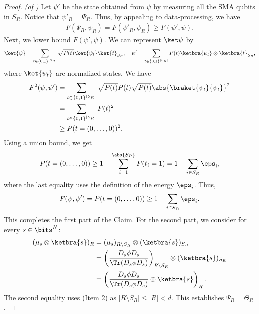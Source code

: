\documentclass{toc}
\begin{document}
%
%
%
%
%
%
%
%
%

\begin{proof}\textit{(of )}
Let $\psi'$ be the state obtained from $\psi$ by measuring all the SMA qubits in $S_R$. Notice that $\psi'_R=\Psi_R$. Thus, by appealing to data-processing, we have
\begin{align}
F(\Psi_R,\psi_R)=F(\psi'_R,\psi_R)\geq F(\psi',\psi).    
\end{align}
Next, we lower bound $F(\psi',\psi)$. We can represent $\ket \psi$ by
\begin{align}
\ket{\psi}=\sum_{t\in \{0,1\}^{|S_R|}}\sqrt{P(t)}\ket{\psi_t}\ket{t}_{S_R},\quad \psi'=\sum_{t\in \{0,1\}^{|S_R|}}P(t)\ketbra{\psi_t}\otimes\ketbra{t}_{S_R},
\end{align}
where $\ket{\psi_t}$ are normalized states. We have
\begin{align}
F^2(\psi,\psi') &= \sum_{t\in \{0,1\}^{|S_R|}}\sqrt{P(t)}P(t)\sqrt{P(t)}\abs{\braket{\psi_t}{\psi_t}}^2 \\ &=\sum_{t\in \{0,1\}^{|S_R|}}P(t)^2 \\
&\geq P(t = (0,\ldots,0))^2.
\end{align}
Using a union bound, we get 
\begin{align}
P(t = (0,\ldots,0)) \geq 1- \sum_{i=1}^{\abs{S_R}}P(t_i=1)= 1-\sum_{i\in S_R}\eps_i,
\end{align}
where the last equality uses the definition of the energy $\eps_i$. Thus,
\begin{align}
F(\psi,\psi')= P(t = (0,\ldots,0)) \geq 1-\sum_{i\in S_R}\eps_i.
\end{align}
This completes the first part of the Claim. For the second part, we consider for every $s\in \bits^N$:
\begin{align}
(\mu_s\otimes \ketbra{s})_{R}&=(\mu_s)_{R\setminus S_R}\otimes (\ketbra{s})_{S_R}\\
&=\left(\frac{D_s\phi D_s}{\Tr(D_s\phi D_s)}\right)_{R\setminus S_R}\otimes (\ketbra{s})_{S_R}\\
&=\left(\frac{D_s\phi D_s}{\Tr(D_s\phi D_s)}\otimes \ketbra{s}\right)_{R}.
\end{align}
The second equality uses  (Item 2) as $|R\setminus S_R|\leq |R|<d$. This establishes $\Psi_R=\Theta_R$.
\end{proof}
\end{document}
